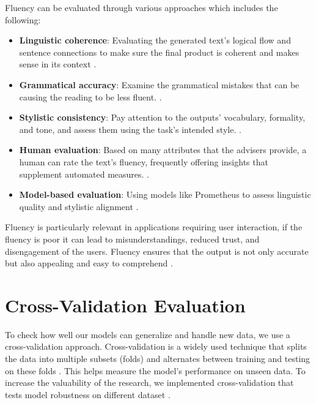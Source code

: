 Fluency can be evaluated through various approaches which includes the following:
\begin{itemize}
    \item \textbf{Linguistic coherence}: Evaluating the generated text's logical flow and sentence connections to make sure the final product is coherent and makes sense in its context \citep{gat2023faithfulexplanationsblackboxnlp}.
    \item \textbf{Grammatical accuracy}: Examine the grammatical mistakes that can be causing the reading to be less fluent. \citep{varshney-etal-2022-towards}.
    \item \textbf{Stylistic consistency}: Pay attention to the outputs' vocabulary, formality, and tone, and assess them using the task's intended style. \citep{yao2023predictinggeneralizationperformancecorrectness}.
    \item \textbf{Human evaluation}: Based on many attributes that the advisers provide, a human can rate the text's fluency, frequently offering insights that supplement automated measures. \citep{jacovi-goldberg-2020-towards}.
    \item \textbf{Model-based evaluation}: Using models like Prometheus to assess linguistic quality and stylistic alignment \citep{kim2024prometheus2opensource}.
\end{itemize}

Fluency is particularly relevant in applications requiring user interaction, if the fluency is poor it can lead to misunderstandings, reduced trust, and disengagement of the users. Fluency ensures that the output is not only accurate but also appealing and easy to comprehend \citep{jacovi-goldberg-2020-towards}.

\section{Cross-Validation Evaluation}

To check how well our models can generalize and handle new data, we use a cross-validation approach. Cross-validation is a widely used technique that splits the data into multiple subsets (folds) and alternates between training and testing on these folds \citep{jiang2017markov, carmack2012generalised, Bergmeir2012On}. This helps measure the model's performance on unseen data. To increase the valuability of the research, we implemented cross-validation that tests model robustness on different dataset \citep{Barratt2018OptimizingFG}.

